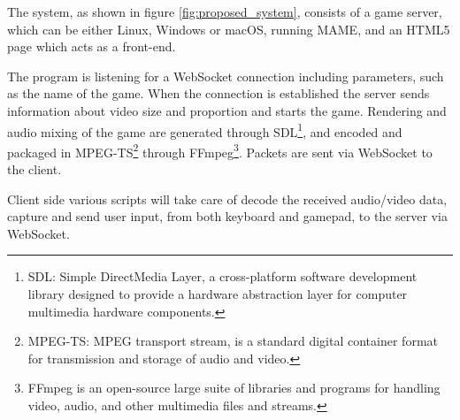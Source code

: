 The system, as shown in figure \ref{fig:proposed_system}, consists of a game server, which can be either Linux, Windows or macOS, running MAME, and an HTML5 page which acts as a front-end.

The program is listening for a WebSocket connection including parameters, such as the name of the game. When the connection is established the server sends information about video size and proportion and starts the game. Rendering and audio mixing of the game are generated through SDL\footnote{SDL: Simple DirectMedia Layer, a cross-platform software development library designed to provide a hardware abstraction layer for computer multimedia hardware components.}, and encoded and packaged in MPEG-TS\footnote{MPEG-TS: MPEG transport stream, is a standard digital container format for transmission and storage of audio and video.} through FFmpeg\footnote{FFmpeg is an open-source large suite of libraries and programs for handling video, audio, and other multimedia files and streams.}. Packets are sent via WebSocket to the client.

Client side various scripts will take care of decode the received audio/video data, capture and send user input, from both keyboard and gamepad, to the server via WebSocket.